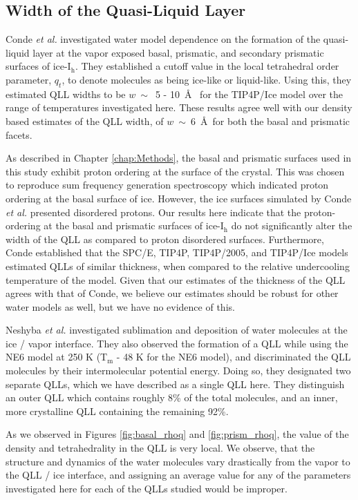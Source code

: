 \subsection{Width of the Quasi-Liquid Layer}
Conde \textit{et al.} investigated water model dependence on the
formation of the quasi-liquid layer at the vapor exposed basal,
prismatic, and secondary prismatic surfaces of
ice-I$_\mathrm{h}$.\cite{Conde2008} They established a cutoff value in
the local tetrahedral order parameter, $q_t$, to denote molecules as
being ice-like or liquid-like. Using this, they estimated QLL widths
to be $w~\sim$~5 - 10~\AA~ for the TIP4P/Ice model over the range of
temperatures investigated here. These results agree well with our
density based estimates of the QLL width, of $w~\sim~6$~\AA~for both
the basal and prismatic facets.

As described in Chapter \ref{chap:Methods}, the basal and prismatic
surfaces used in this study exhibit proton ordering at the surface of
the crystal. This was chosen to reproduce sum frequency generation
spectroscopy which indicated proton ordering at the basal surface of
ice. However, the ice surfaces simulated by Conde \textit{et al.}
presented disordered protons. Our results here indicate that the
proton-ordering at the basal and prismatic surfaces of
ice-I$_\mathrm{h}$ do not significantly alter the width of the QLL as
compared to proton disordered surfaces.  Furthermore, Conde
established that the SPC/E, TIP4P, TIP4P/2005, and TIP4P/Ice models
estimated QLLs of similar thickness, when compared to the relative
undercooling temperature of the model.\cite{Conde2008} Given that our
estimates of the thickness of the QLL agrees with that of Conde, we
believe our estimates should be robust for other water models as well,
but we have no evidence of this.

Neshyba \textit{et al.} investigated sublimation and deposition of
water molecules at the ice / vapor interface.\cite{Neshyba2009} They
also observed the formation of a QLL while using the NE6
model\cite{Nada2003a} at 250 K (T$_\mathrm{m}$ - 48 K for the NE6
model), and discriminated the QLL molecules by their intermolecular
potential energy. Doing so, they designated two separate QLLs, which
we have described as a single QLL here. They distinguish an outer QLL
which contains roughly 8\% of the total molecules, and an inner, more
crystalline QLL containing the remaining 92\%. 

As we observed in Figures \ref{fig:basal_rhoq} and
\ref{fig:prism_rhoq}, the value of the density and tetrahedrality in
the QLL is very local. We observe, that the structure and dynamics of
the water molecules vary drastically from the vapor to the QLL / ice
interface, and assigning an average value for any of the parameters
investigated here for each of the QLLs studied would be improper.


